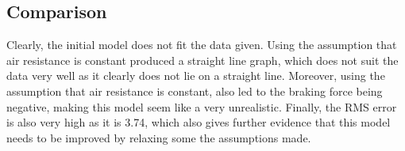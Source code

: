 \subsection{Comparison}
Clearly, the initial model does not fit the data given. Using the assumption that air resistance is constant produced a straight line graph, which does not suit the data very well as it clearly does not lie on a straight line. Moreover, using the assumption that air resistance is constant, also led to the braking force being negative, making this model seem like a very unrealistic. Finally, the RMS error is also very high as it is 3.74, which also gives further evidence that this model needs to be improved by relaxing some the assumptions made.